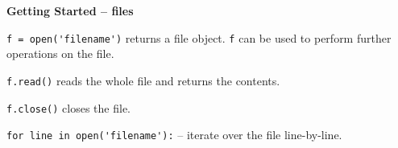 \textbf{Getting Started -- files}

\lstinline|f = open('filename')| returns a file object. \lstinline|f|
can be used to perform further operations on the file. 

\lstinline|f.read()| reads the whole file and returns the contents. 

\lstinline|f.close()| closes the file. 

\lstinline|for line in open('filename'):| -- iterate over the file
line-by-line. 

